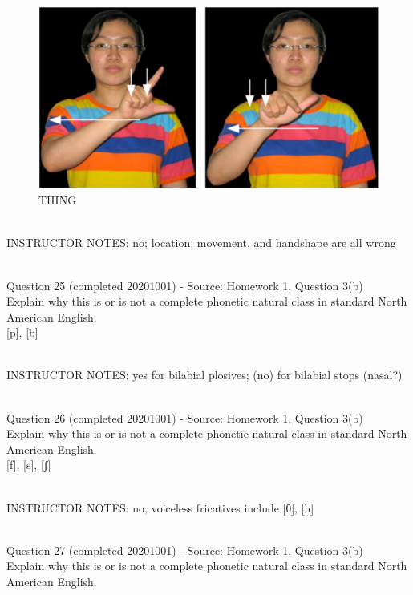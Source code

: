 \documentclass[12pt]{article}
\begin{document}
\begin{figure}[H]
\includegraphics{../images/taiwansign_thing.png}
\caption{THING}
\end{figure}

~\\
INSTRUCTOR NOTES: no; location, movement, and handshape are all wrong


~\\

{\large Question 25} (completed 20201001) - Source: Homework 1, Question 3(b)\\

Explain why this is or is not a complete phonetic natural class in standard North American English.\\

{[p]}, {[b]}


~\\
INSTRUCTOR NOTES: yes for bilabial plosives; (no) for bilabial stops (nasal?)


~\\

{\large Question 26} (completed 20201001) - Source: Homework 1, Question 3(b)\\

Explain why this is or is not a complete phonetic natural class in standard North American English.\\

{[f]}, {[s]}, {[ʃ]}


~\\
INSTRUCTOR NOTES: no; voiceless fricatives include [θ], [h]


~\\

{\large Question 27} (completed 20201001) - Source: Homework 1, Question 3(b)\\

Explain why this is or is not a complete phonetic natural class in standard North American English.\\
\end{document}
